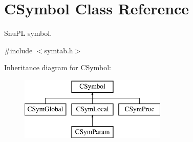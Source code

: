 \hypertarget{classCSymbol}{\section{C\-Symbol Class Reference}
\label{classCSymbol}
}


Snu\-P\-L symbol.  




{\ttfamily \#include $<$symtab.\-h$>$}

Inheritance diagram for C\-Symbol\-:\begin{figure}[H]
\begin{center}
\leavevmode
\includegraphics[height=3.000000cm]{classCSymbol}
\end{center}
\end{figure}
